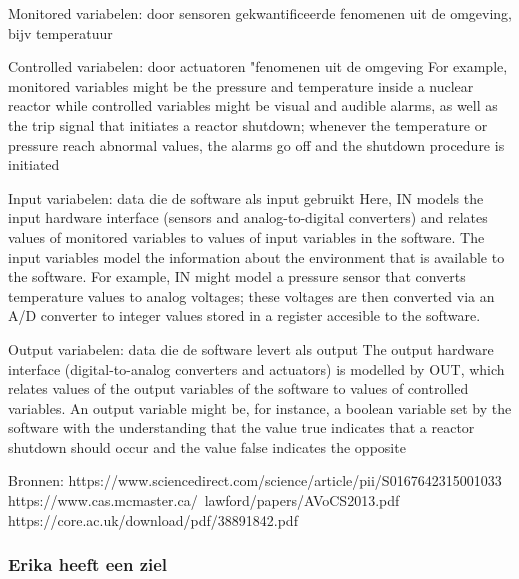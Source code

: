 Monitored variabelen: door sensoren gekwantificeerde fenomenen uit de omgeving, bijv temperatuur

Controlled variabelen: door actuatoren \bestuurde"fenomenen uit de omgeving
For example, monitored variables might be the pressure and temperature
inside a nuclear reactor while controlled variables might be visual and audible alarms, as well
as the trip signal that initiates a reactor shutdown; whenever the temperature or pressure reach
abnormal values, the alarms go off and the shutdown procedure is initiated

Input variabelen: data die de software als input gebruikt
Here, IN models the input hardware interface (sensors and analog-to-digital converters) and
relates values of monitored variables to values of input variables in the software. The input variables model the information about the environment that is available to the software. For example,
IN might model a pressure sensor that converts temperature values to analog voltages; these voltages are then converted via an A/D converter to integer values stored in a register accesible to the
software.

Output variabelen: data die de software levert als output
The output hardware interface (digital-to-analog converters and actuators) is modelled
by OUT, which relates values of the output variables of the software to values of controlled variables. An output variable might be, for instance, a boolean variable set by the software with the
understanding that the value true indicates that a reactor shutdown should occur and the value
false indicates the opposite

Bronnen:
https://www.sciencedirect.com/science/article/pii/S0167642315001033
https://www.cas.mcmaster.ca/~lawford/papers/AVoCS2013.pdf
https://core.ac.uk/download/pdf/38891842.pdf
\subsubsection{Erika heeft een ziel}

